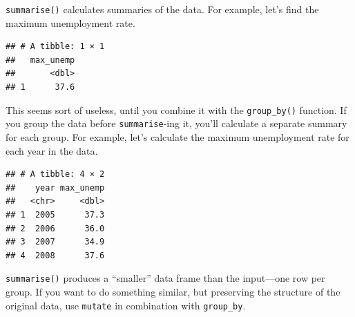 \documentclass[12pt,oneside,openany]{tufte-book}
\newenvironment{Shaded}{}{}
\newcommand{\KeywordTok}[1]{\textcolor[rgb]{0.00,0.44,0.13}{\textbf{{#1}}}}
\newcommand{\DataTypeTok}[1]{\textcolor[rgb]{0.56,0.13,0.00}{{#1}}}
\newcommand{\StringTok}[1]{\textcolor[rgb]{0.25,0.44,0.63}{{#1}}}
\newcommand{\OtherTok}[1]{\textcolor[rgb]{0.00,0.44,0.13}{{#1}}}
\newcommand{\NormalTok}[1]{{#1}}
\begin{document}
\texttt{summarise()} calculates summaries of the data. For example,
let's find the maximum unemployment rate.

\begin{Shaded}
\end{Shaded}

\begin{verbatim}
## # A tibble: 1 × 1
##   max_unemp
##       <dbl>
## 1      37.6
\end{verbatim}

This seems sort of useless, until you combine it with the
\texttt{group\_by()} function. If you group the data before
\texttt{summarise}-ing it, you'll calculate a separate summary for each
group. For example, let's calculate the maximum unemployment rate for
each year in the data.

\begin{Shaded}
\end{Shaded}

\begin{verbatim}
## # A tibble: 4 × 2
##    year max_unemp
##   <chr>     <dbl>
## 1  2005      37.3
## 2  2006      36.0
## 3  2007      34.9
## 4  2008      37.6
\end{verbatim}

\texttt{summarise()} produces a ``smaller'' data frame than the
input---one row per group. If you want to do something similar, but
preserving the structure of the original data, use \texttt{mutate} in
combination with \texttt{group\_by}.

\begin{Shaded}
\end{Shaded}
\end{document}
